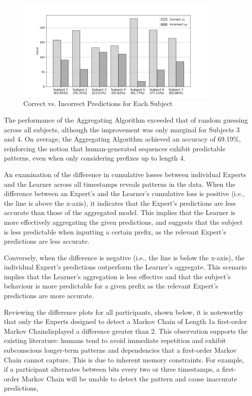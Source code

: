 \begin{figure}[h]
    \centering
    \includegraphics[width=0.9\textwidth]{images/prediction_results.jpg}
    \caption{Correct vs. Incorrect Predictions for Each Subject}
    \label{prediction_results}
\end{figure}

The performance of the Aggregating Algorithm exceeded that of random guessing across all subjects, although the improvement was only marginal for Subjects 3 and 4. On average, the Aggregating Algorithm achieved an accuracy of 69.19\%, reinforcing the notion that human-generated sequences exhibit predictable patterns, even when only considering prefixes up to length $4$.

An examination of the difference in cumulative losses between individual Experts and the Learner across all timestamps reveals patterns in the data. When the difference between an Expert's and the Learner's cumulative loss is positive (i.e., the line is above the x-axis), it indicates that the Expert's predictions are less accurate than those of the aggregated model. This implies that the Learner is more effectively aggregating the given predictions, and suggests that the subject is less predictable when inputting a certain prefix, as the relevant Expert's predictions are less accurate.

Conversely, when the difference is negative (i.e., the line is below the x-axis), the individual Expert's predictions outperform the Learner's aggregate. This scenario implies that the Learner's aggregation is less effective and that the subject's behaviour is more predictable for a given prefix as the relevant Expert's predictions are more accurate.

Reviewing the difference plots for all participants, shown below, it is noteworthy that only the Experts designed to detect a Markov Chain of Length 1\textemdash{}a first-order Markov Chain\textemdash{}displayed a difference greater than 2. This observation supports the existing literature: humans tend to avoid immediate repetition and exhibit subconscious longer-term patterns and dependencies that a first-order Markov Chain cannot capture. This is due to inherent memory constraints. For example, if a participant alternates between bits every two or three timestamps, a first-order Markov Chain will be unable to detect the pattern and cause inaccurate predictions,


